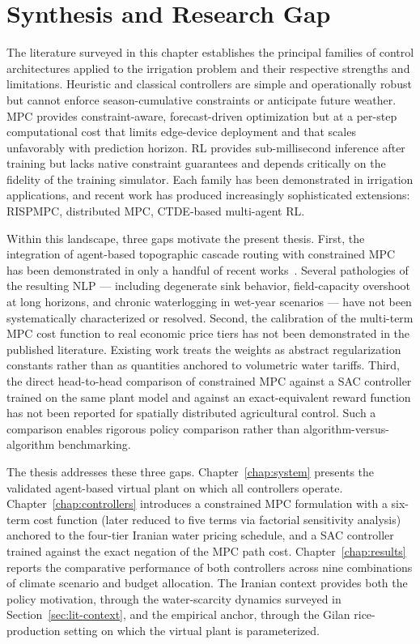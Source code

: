\section{Synthesis and Research Gap}
\label{sec:lit-gap}

The literature surveyed in this chapter establishes the principal
families of control architectures applied to the irrigation problem
and their respective strengths and limitations. Heuristic and
classical controllers are simple and operationally robust but cannot
enforce season-cumulative constraints or anticipate future weather.
MPC provides constraint-aware, forecast-driven optimization but at a
per-step computational cost that limits edge-device deployment and
that scales unfavorably with prediction horizon. RL provides
sub-millisecond inference after training but lacks native constraint
guarantees and depends critically on the fidelity of the training
simulator. Each family has been demonstrated in irrigation
applications, and recent work has produced increasingly sophisticated
extensions: RISPMPC, distributed MPC, CTDE-based multi-agent RL.

Within this landscape, three gaps motivate the present thesis. First,
the integration of agent-based topographic cascade routing with
constrained MPC has been demonstrated in only a handful of recent
works~\cite{Lopezjimenez2024,LopezJimenez2022}. Several pathologies
of the resulting NLP --- including degenerate sink behavior,
field-capacity overshoot at long horizons, and chronic waterlogging
in wet-year scenarios --- have not been systematically characterized
or resolved. Second, the calibration of the multi-term MPC cost
function to real economic price tiers has not been demonstrated in
the published literature. Existing work treats the weights as
abstract regularization constants rather than as quantities anchored
to volumetric water tariffs. Third, the direct head-to-head
comparison of constrained MPC against a SAC controller trained on
the same plant model and against an exact-equivalent reward function
has not been reported for spatially distributed agricultural
control. Such a comparison enables rigorous policy comparison rather
than algorithm-versus-algorithm benchmarking.

The thesis addresses these three gaps. Chapter~\ref{chap:system}
presents the validated agent-based virtual plant on which all
controllers operate. Chapter~\ref{chap:controllers} introduces a
constrained MPC formulation with a six-term cost function (later
reduced to five terms via factorial sensitivity analysis) anchored
to the four-tier Iranian water pricing schedule, and a SAC controller
trained against the exact negation of the MPC path cost.
Chapter~\ref{chap:results} reports the comparative performance of
both controllers across nine combinations of climate scenario and
budget allocation. The Iranian context provides both the policy
motivation, through the water-scarcity dynamics surveyed in
Section~\ref{sec:lit-context}, and the empirical anchor, through
the Gilan rice-production setting on which the virtual plant is
parameterized.
